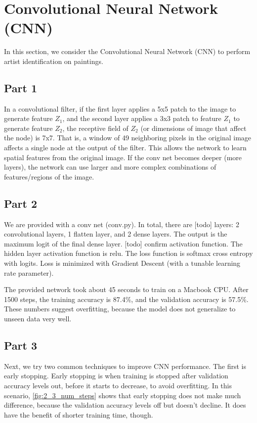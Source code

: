 \section{Convolutional Neural Network (CNN)} \label{sec:prob2}
In this section, we consider the Convolutional Neural Network (CNN) to perform artist identification on paintings.

\subsection{Part 1}
In a convolutional filter, if the first layer applies a 5x5 patch to the image to generate feature $Z_1$, and the second layer applies a 3x3 patch to feature $Z_1$ to generate feature $Z_2$, the receptive field of $Z_2$ (or dimensions of image that affect the node) is 7x7.
That is, a window of 49 neighboring pixels in the original image affects a single node at the output of the filter.
This allows the network to learn spatial features from the original image.
If the conv net becomes deeper (more layers), the network can use larger and more complex combinations of features/regions of the image.

\subsection{Part 2}
We are provided with a conv net (conv.py).
In total, there are [todo] layers: 2 convolutional layers, 1 flatten layer, and 2 dense layers.
The output is the maximum logit of the final dense layer.
[todo] confirm activation function. The hidden layer activation function is relu.
The loss function is softmax cross entropy with logits.
Loss is minimized with Gradient Descent (with a tunable learning rate parameter).

The provided network took about 45 seconds to train on a Macbook CPU.
After 1500 steps, the training accuracy is 87.4\%, and the validation accuracy is 57.5\%.
These numbers suggest overfitting, because the model does not generalize to unseen data very well.

\subsection{Part 3}
Next, we try two common techniques to improve CNN performance.
The first is early stopping.
Early stopping is when training is stopped after validation accuracy levels out, before it starts to decrease, to avoid overfitting.
In this scenario, \cref{fig:2_3_num_steps} shows that early stopping does not make much difference, because the validation accuracy levels off but doesn't decline.
It does have the benefit of shorter training time, though.


